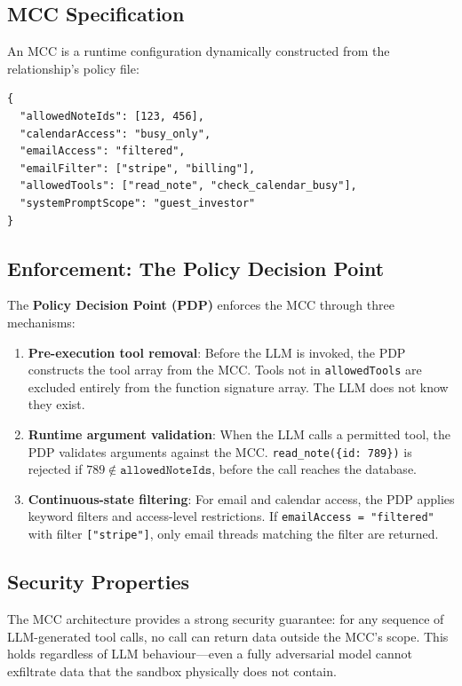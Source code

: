 \subsection{MCC Specification}

An MCC is a runtime configuration dynamically constructed from the relationship's policy file:

\begin{verbatim}
{
  "allowedNoteIds": [123, 456],
  "calendarAccess": "busy_only",
  "emailAccess": "filtered",
  "emailFilter": ["stripe", "billing"],
  "allowedTools": ["read_note", "check_calendar_busy"],
  "systemPromptScope": "guest_investor"
}
\end{verbatim}

\subsection{Enforcement: The Policy Decision Point}

The \textbf{Policy Decision Point (PDP)} enforces the MCC through three mechanisms:

\begin{enumerate}
    \item \textbf{Pre-execution tool removal}: Before the LLM is invoked, the PDP constructs the tool array from the MCC. Tools not in \texttt{allowedTools} are excluded entirely from the function signature array. The LLM does not know they exist.

    \item \textbf{Runtime argument validation}: When the LLM calls a permitted tool, the PDP validates arguments against the MCC. \texttt{read\_note(\{id: 789\})} is rejected if $789 \notin \texttt{allowedNoteIds}$, before the call reaches the database.

    \item \textbf{Continuous-state filtering}: For email and calendar access, the PDP applies keyword filters and access-level restrictions. If \texttt{emailAccess = "filtered"} with filter \texttt{["stripe"]}, only email threads matching the filter are returned.
\end{enumerate}

\subsection{Security Properties}

The MCC architecture provides a strong security guarantee: for any sequence of LLM-generated tool calls, no call can return data outside the MCC's scope. This holds regardless of LLM behaviour---even a fully adversarial model cannot exfiltrate data that the sandbox physically does not contain.

